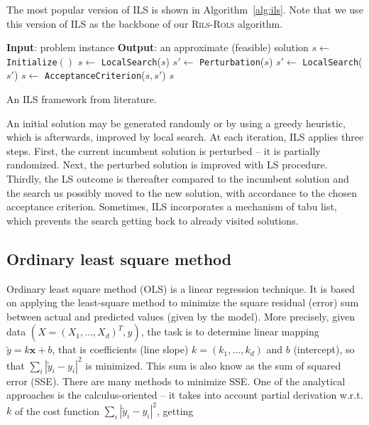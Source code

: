 \documentclass[a4paper,12pt]{elsarticle}
\begin{document}
	The most popular version of ILS is shown in Algorithm~\ref{alg:ils}. Note that we use this version of ILS as the backbone of our \textsc{Rils}-\textsc{Rols}  algorithm.
	
	\begin{algorithm}
		\begin{algorithmic}[1] 
			\State \textbf{Input}: problem instance
			\State \textbf{Output}: an approximate (feasible) solution 
			\State $s \gets$ \texttt{Initialize}$()$
			\State  $s \gets$ \texttt{LocalSearch}($s$)
			\State  $s' \gets$ \texttt{Perturbation}($s$)
			\State  $s' \gets$ \texttt{LocalSearch}($s'$)
			\State  $ s \gets$ \texttt{AcceptanceCriterion}($s, s'$)
			\EndWhile
			\State \Return $s$
		\end{algorithmic}
		\caption{An ILS framework from   literature.}
		\label{alg:ils}
	\end{algorithm}  
	
	An initial solution may be generated randomly or by using a greedy heuristic, which is afterwards, improved by local search. At each iteration, ILS applies three steps. First, the current incumbent solution is perturbed -- it is partially randomized. Next, the perturbed solution is improved with LS procedure. Thirdly, the LS outcome is thereafter compared to the incumbent solution and the search us possibly moved to the new solution, with accordance to the chosen acceptance criterion. Sometimes, ILS incorporates a mechanism of tabu list, which prevents the search getting back to already visited solutions. 
	
	\subsection{Ordinary least square method}\label{sec:ols}
	Ordinary least square method (OLS) is a linear regression technique. It is based on applying the least-square method to minimize the square residual (error) sum  between actual and predicted values (given by the model). More precisely, given data $({X}=(X_1, \ldots, X_d)^T, y)$, the task is to determine linear mapping $\tilde{y} = k \textbf{x} + b$, that is coefficients (line slope) $k = (k_1, \ldots, k_d)$ and $b$ (intercept), so that $ \sum_{i} |\tilde{y}_i - y_i|^2 $ is minimized. This sum is also know as the sum of squared error (SSE). There are many methods to minimize SSE. One of the analytical approaches is the calculus-oriented -- it takes into account   partial derivation w.r.t. $k$ of the cost function $ \sum_{i} |\tilde{y}_i - y_i|^2 $, getting 
	
\end{document}
